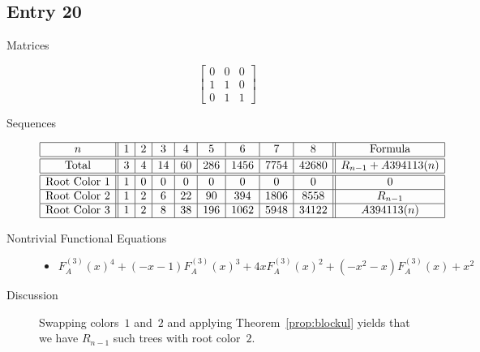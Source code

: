 \documentclass[12pt]{amsart}
\newcommand{\gff}[2]{F_{#2}^{(#1)}(x)}
\newcommand{\gfa}[1]{\gff{#1}{A}}
\begin{document}
\subsection*{Entry 20}
\begin{description}
    \item[Matrices]
    
    \[\begin{bmatrix}
0 & 0 & 0 \\
1 & 1 & 0 \\
0 & 1 & 1
\end{bmatrix}\]
    \item[Sequences]\hspace*{\fill}\vspace{-0.5cm}
    \begin{center}
        \[
        \begin{array}{|c||c|c|c|c|c|c|c|c||c|}\hline
           n  & 1 & 2 & 3 & 4 & 5 & 6 & 7 & 8  & \text{Formula}\\\hline\hline
           \text{Total}  & 3 & 4 & 14 & 60 & 286 & 1456 & 7754 & 42680 & R_{n-1}+A394113(n) \\\hline\hline
           \text{Root Color }1 & 1 & 0 & 0 & 0 & 0 & 0 & 0 & 0 & 0\\\hline
           \text{Root Color }2 & 1 & 2 & 6 & 22 & 90 & 394 & 1806 & 8558 & R_{n-1}\\\hline
           \text{Root Color }3 & 1 & 2 & 8 & 38 & 196 & 1062 & 5948 & 34122 & A394113(n) \\\hline
        \end{array}
        \]
    \end{center}
    
    \item[Nontrivial Functional Equations]\hspace*{\fill}

    \begin{itemize}
\item $\gfa{3}^4+(-x - 1)\gfa{3}^3+4x\gfa{3}^2+(-x^2 - x)\gfa{3}+x^2$

\end{itemize}
    \item[Discussion] Swapping colors~$1$ and~$2$ and applying Theorem~\ref{prop:blockul} yields that we have $R_{n-1}$ such trees with root color~$2$. 
    
\end{description}
\end{document}
